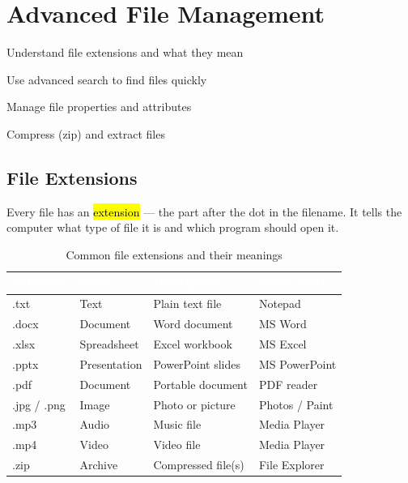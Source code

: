
\chapter{Advanced File Management}
\label{ch:files-adv}

\begin{objectives}
  \item Understand file extensions and what they mean
  \item Use advanced search to find files quickly
  \item Manage file properties and attributes
  \item Compress (zip) and extract files
\end{objectives}


\section{File Extensions}
\label{sec:extensions}

Every file has an \hl{extension} --- the part after the dot in the filename. It tells the computer what type of file it is and which program should open it.

\begin{table}[H]
\centering
\caption{Common file extensions and their meanings}
\label{tab:extensions}
\renewcommand{\arraystretch}{1.3}
\begin{tabularx}{\textwidth}{l l X l}
\toprule
\rowcolor{HeaderRow}
\textcolor{white}{\textbf{Extension}} & \textcolor{white}{\textbf{Type}} & \textcolor{white}{\textbf{Description}} & \textcolor{white}{\textbf{Opens With}} \\
\midrule
\rowcolor{RowLight} .txt & Text & Plain text file & Notepad \\
\rowcolor{RowDark} .docx & Document & Word document & MS Word \\
\rowcolor{RowLight} .xlsx & Spreadsheet & Excel workbook & MS Excel \\
\rowcolor{RowDark} .pptx & Presentation & PowerPoint slides & MS PowerPoint \\
\rowcolor{RowLight} .pdf & Document & Portable document & PDF reader \\
\rowcolor{RowDark} .jpg / .png & Image & Photo or picture & Photos / Paint \\
\rowcolor{RowLight} .mp3 & Audio & Music file & Media Player \\
\rowcolor{RowDark} .mp4 & Video & Video file & Media Player \\
\rowcolor{RowLight} .zip & Archive & Compressed file(s) & File Explorer \\
\bottomrule
\end{tabularx}
\end{table}

